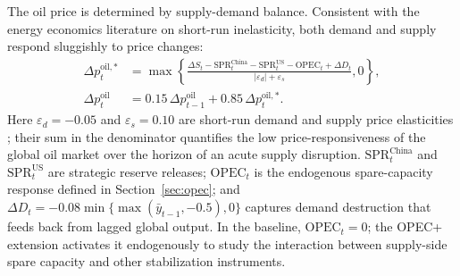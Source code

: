 \documentclass[12pt]{article}
\begin{document}
The oil price is determined by supply-demand balance. Consistent with the energy economics literature on short-run inelasticity, both demand and supply respond sluggishly to price changes:
\begin{equation}
\begin{aligned}
\Delta p^{\text{oil},*}_t
&= \max\left\{
\frac{\Delta S_t - \text{SPR}^{\text{China}}_t - \text{SPR}^{\text{US}}_t - \text{OPEC}_t + \Delta D_t}
{|\varepsilon_d| + \varepsilon_s},0\right\}, \\
\Delta p^{\text{oil}}_t
&= 0.15\,\Delta p^{\text{oil}}_{t-1}+0.85\,\Delta p^{\text{oil},*}_t.
\end{aligned}
\label{eq:oil_price}
\end{equation}
Here $\varepsilon_d = -0.05$ and $\varepsilon_s = 0.10$ are short-run demand and supply price elasticities \citep{hamilton2009understanding}; their sum in the denominator quantifies the low price-responsiveness of the global oil market over the horizon of an acute supply disruption. $\text{SPR}^{\text{China}}_t$ and $\text{SPR}^{\text{US}}_t$ are strategic reserve releases; $\text{OPEC}_t$ is the endogenous spare-capacity response defined in Section~\ref{sec:opec}; and $\Delta D_t = -0.08\min\{\max(\bar{y}_{t-1},-0.5),0\}$ captures demand destruction that feeds back from lagged global output. In the baseline, $\text{OPEC}_t = 0$; the OPEC+ extension activates it endogenously to study the interaction between supply-side spare capacity and other stabilization instruments.
\end{document}
